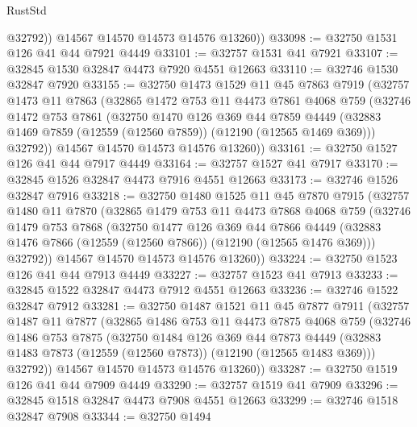 \begin{lexlean}{RustStd}
\begin{coremodule}
            @32792))
        @14567
        @14570
        @14573
        @14576
        @13260))
@33098 := @32750 @1531 @126 @41 @44 @7921 @4449
@33101 := @32757 @1531 @41 @7921
@33107 := @32845 @1530 @32847 @4473 @7920 @4551 @12663
@33110 := @32746 @1530 @32847 @7920
@33155 := @32750
    @1473
    @1529
    @11
    @45
    @7863
    @7919
    (@32757
      @1473
      @11
      @7863
      (@32865
        @1472
        @753
        @11
        @4473
        @7861
        @4068
        @759
        (@32746
          @1472
          @753
          @7861
          (@32750
            @1470
            @126
            @369
            @44
            @7859
            @4449
            (@32883 @1469 @7859 (@12559 (@12560 @7859)) (@12190 (@12565 @1469 @369)))
            @32792))
        @14567
        @14570
        @14573
        @14576
        @13260))
@33161 := @32750 @1527 @126 @41 @44 @7917 @4449
@33164 := @32757 @1527 @41 @7917
@33170 := @32845 @1526 @32847 @4473 @7916 @4551 @12663
@33173 := @32746 @1526 @32847 @7916
@33218 := @32750
    @1480
    @1525
    @11
    @45
    @7870
    @7915
    (@32757
      @1480
      @11
      @7870
      (@32865
        @1479
        @753
        @11
        @4473
        @7868
        @4068
        @759
        (@32746
          @1479
          @753
          @7868
          (@32750
            @1477
            @126
            @369
            @44
            @7866
            @4449
            (@32883 @1476 @7866 (@12559 (@12560 @7866)) (@12190 (@12565 @1476 @369)))
            @32792))
        @14567
        @14570
        @14573
        @14576
        @13260))
@33224 := @32750 @1523 @126 @41 @44 @7913 @4449
@33227 := @32757 @1523 @41 @7913
@33233 := @32845 @1522 @32847 @4473 @7912 @4551 @12663
@33236 := @32746 @1522 @32847 @7912
@33281 := @32750
    @1487
    @1521
    @11
    @45
    @7877
    @7911
    (@32757
      @1487
      @11
      @7877
      (@32865
        @1486
        @753
        @11
        @4473
        @7875
        @4068
        @759
        (@32746
          @1486
          @753
          @7875
          (@32750
            @1484
            @126
            @369
            @44
            @7873
            @4449
            (@32883 @1483 @7873 (@12559 (@12560 @7873)) (@12190 (@12565 @1483 @369)))
            @32792))
        @14567
        @14570
        @14573
        @14576
        @13260))
@33287 := @32750 @1519 @126 @41 @44 @7909 @4449
@33290 := @32757 @1519 @41 @7909
@33296 := @32845 @1518 @32847 @4473 @7908 @4551 @12663
@33299 := @32746 @1518 @32847 @7908
@33344 := @32750
    @1494

\end{coremodule}
\end{lexlean}
